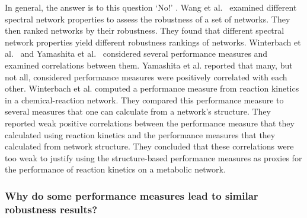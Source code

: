\documentclass{comnet-mod}
\begin{document}
In general, the answer is to this question `No!' \cite{Erlebach2006, Alderson2010, Winterbach2011, Ventresca2014, Cuadra2015, Wang2018, Yamashita2019}. Wang et al.~\cite{Wang2018} examined different spectral network properties to assess the robustness of a set of networks. They then ranked networks by their robustness. They found that different spectral network properties yield different robustness rankings of networks. Winterbach et al.~\cite{Winterbach2011} and Yamashita et al.~\cite{Yamashita2019} considered several performance measures and examined correlations between them. Yamashita et al. reported that many, but not all, considered performance measures were positively correlated with each other. Winterbach et al. computed a performance measure from reaction kinetics in a chemical-reaction network. They compared this performance measure to several measures that one can calculate from a network's structure. They reported weak positive correlations between the performance measure that they calculated using reaction kinetics and the performance measures that they calculated from network structure. They concluded that these correlations were too weak to justify using the structure-based performance measures as proxies for the performance of reaction kinetics on a metabolic network.


\subsubsection{Why do some performance measures lead to similar robustness results?}
\label{sec:well-connectedness}
\end{document}

